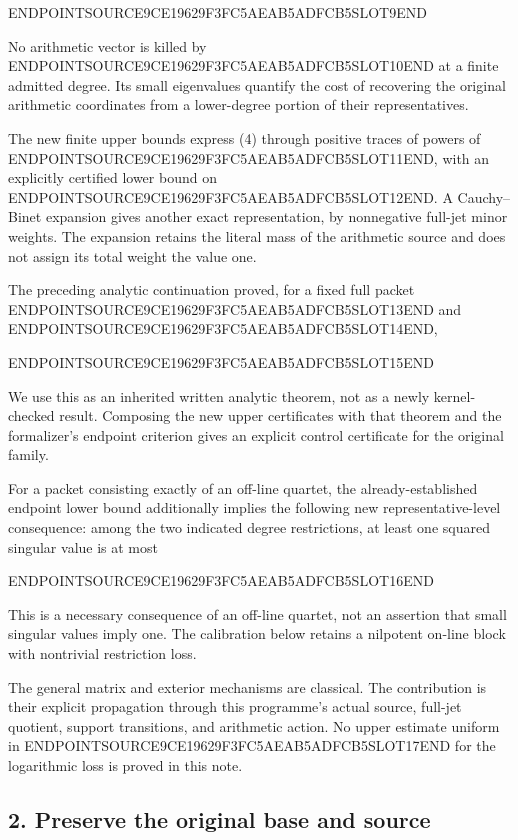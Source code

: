 ENDPOINTSOURCE9CE19629F3FC5AEAB5ADFCB5SLOT9END

No arithmetic vector is killed by ENDPOINTSOURCE9CE19629F3FC5AEAB5ADFCB5SLOT10END at a finite admitted degree. Its small eigenvalues quantify the cost of recovering the original arithmetic coordinates from a lower-degree portion of their representatives.

The new finite upper bounds express (4) through positive traces of powers of ENDPOINTSOURCE9CE19629F3FC5AEAB5ADFCB5SLOT11END, with an explicitly certified lower bound on ENDPOINTSOURCE9CE19629F3FC5AEAB5ADFCB5SLOT12END. A Cauchy--Binet expansion gives another exact representation, by nonnegative full-jet minor weights. The expansion retains the literal mass of the arithmetic source and does not assign its total weight the value one.

The preceding analytic continuation proved, for a fixed full packet ENDPOINTSOURCE9CE19629F3FC5AEAB5ADFCB5SLOT13END and ENDPOINTSOURCE9CE19629F3FC5AEAB5ADFCB5SLOT14END,

ENDPOINTSOURCE9CE19629F3FC5AEAB5ADFCB5SLOT15END

We use this as an inherited written analytic theorem, not as a newly kernel-checked result. Composing the new upper certificates with that theorem and the formalizer's endpoint criterion gives an explicit control certificate for the original family.

For a packet consisting exactly of an off-line quartet, the already-established endpoint lower bound additionally implies the following new representative-level consequence: among the two indicated degree restrictions, at least one squared singular value is at most

ENDPOINTSOURCE9CE19629F3FC5AEAB5ADFCB5SLOT16END

This is a necessary consequence of an off-line quartet, not an assertion that small singular values imply one. The calibration below retains a nilpotent on-line block with nontrivial restriction loss.

The general matrix and exterior mechanisms are classical. The contribution is their explicit propagation through this programme's actual source, full-jet quotient, support transitions, and arithmetic action. No upper estimate uniform in ENDPOINTSOURCE9CE19629F3FC5AEAB5ADFCB5SLOT17END for the logarithmic loss is proved in this note.

\subsection{2. Preserve the original base and source}\label{endpoint-restriction_original--preserve-the-original-base-and-source}

